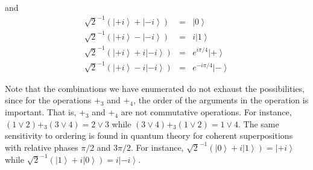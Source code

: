 \documentclass[pra,twocolumn,nofootinbib,showpacs]{revtex4}
\begin{document}
and
\begin{eqnarray}
\sqrt{2}^{-1}\left( \left| +i\right\rangle +\left| -i\right\rangle \right)
&=&\left| 0\right\rangle  \label{cs9} \\
\sqrt{2}^{-1}\left( \left| +i\right\rangle -\left| -i\right\rangle \right)
&=&i\left| 1\right\rangle  \label{cs10} \\
\sqrt{2}^{-1}\left( \left| +i\right\rangle +i\left| -i\right\rangle \right)
&=&e^{i\pi /4}\left| +\right\rangle  \label{cs11} \\
\sqrt{2}^{-1}\left( \left| +i\right\rangle -i\left| -i\right\rangle \right)
&=&e^{-i\pi /4}\left| -\right\rangle  \label{cs12}
\end{eqnarray}

Note that the combinations we have enumerated do not exhaust the
possibilities, since for the operations $+_{3}$ and $+_{4}$, the order of
the arguments in the operation is important. That is, $+_{3}$ and $+_{4}$
are not commutative operations. For instance, $(1\vee 2)+_{3}(3\vee 4)=2\vee
3$ while $(3\vee 4)+_{3}(1\vee 2)=1\vee 4.$ The same sensitivity to ordering
is found in quantum theory for coherent superpositions with relative phases $%
\pi /2$ and $3\pi /2$. For instance, $\sqrt{2}^{-1}\left( \left|
0\right\rangle +i\left| 1\right\rangle \right) =\left| +i\right\rangle $
while $\sqrt{2}^{-1}\left( \left| 1\right\rangle +i\left| 0\right\rangle
\right) =i\left| -i\right\rangle .$
\end{document}
